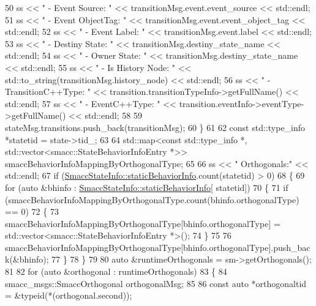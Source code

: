 \begin{DoxyCode}
50             ss << \textcolor{stringliteral}{"      - Event Source: "} << transitionMsg.event.event\_source << std::endl;
51             ss << \textcolor{stringliteral}{"      - Event ObjectTag: "} << transitionMsg.event.event\_object\_tag << std::endl;
52             ss << \textcolor{stringliteral}{"      - Event Label: "} << transitionMsg.event.label << std::endl;
53             ss << \textcolor{stringliteral}{"      - Destiny State: "} << transitionMsg.destiny\_state\_name << std::endl;
54             ss << \textcolor{stringliteral}{"      - Owner State: "} << transitionMsg.destiny\_state\_name << std::endl;
55             ss << \textcolor{stringliteral}{"      - Is History Node: "} << std::to\_string(transitionMsg.history\_node) << std::endl;
56             ss << \textcolor{stringliteral}{"      - TransitionC++Type: "} << transition.transitionTypeInfo->getFullName() << 
      std::endl;
57             ss << \textcolor{stringliteral}{"      - EventC++Type: "} << transition.eventInfo->eventType->getFullName() << std::endl;
58 
59             stateMsg.transitions.push\_back(transitionMsg);
60         \}
61 
62         \textcolor{keyword}{const} std::type\_info *statetid = state->tid\_;
63 
64         std::map<const std::type\_info *, std::vector<smacc::StateBehaviorInfoEntry *>> 
      smaccBehaviorInfoMappingByOrthogonalType;
65 
66         ss << \textcolor{stringliteral}{" Orthogonals:"} << std::endl;
67         \textcolor{keywordflow}{if} (\hyperlink{classsmacc_1_1SmaccStateInfo_a2cc62c6c9dec1a4f5294f8430efb71f2}{SmaccStateInfo::staticBehaviorInfo}.count(statetid) > 0)
68         \{
69             \textcolor{keywordflow}{for} (\textcolor{keyword}{auto} &bhinfo : \hyperlink{classsmacc_1_1SmaccStateInfo_a2cc62c6c9dec1a4f5294f8430efb71f2}{SmaccStateInfo::staticBehaviorInfo}[
      statetid])
70             \{
71                 \textcolor{keywordflow}{if} (smaccBehaviorInfoMappingByOrthogonalType.count(bhinfo.orthogonalType) == 0)
72                 \{
73                     smaccBehaviorInfoMappingByOrthogonalType[bhinfo.orthogonalType] = 
      std::vector<smacc::StateBehaviorInfoEntry *>();
74                 \}
75 
76                 smaccBehaviorInfoMappingByOrthogonalType[bhinfo.orthogonalType].push\_back(&bhinfo);
77             \}
78         \}
79 
80         \textcolor{keyword}{auto} &runtimeOrthogonals = sm->getOrthogonals();
81 
82         \textcolor{keywordflow}{for} (\textcolor{keyword}{auto} &orthogonal : runtimeOrthogonals)
83         \{
84             smacc\_msgs::SmaccOrthogonal orthogonalMsg;
85 
86             \textcolor{keyword}{const} \textcolor{keyword}{auto} *orthogonaltid = &\textcolor{keyword}{typeid}(*(orthogonal.second));

\end{DoxyCode}
